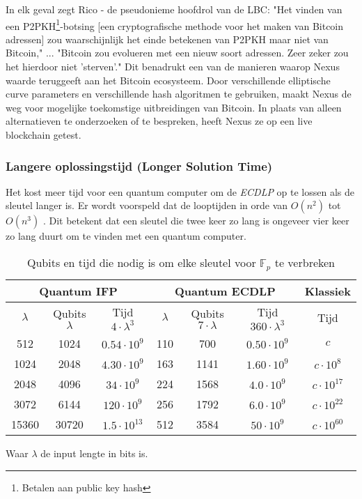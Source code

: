\documentclass[11pt]{article}
\begin{document}
\noindent In elk geval zegt Rico - de pseudonieme hoofdrol van de LBC: "Het vinden van een P2PKH\footnote{Betalen aan public key hash\cite{p2pkh}}-botsing [een cryptografische methode voor het maken van Bitcoin adressen] zou waarschijnlijk het einde betekenen van P2PKH maar niet van Bitcoin," ... "Bitcoin zou evolueren met een nieuw soort adressen. Zeer zeker zou het hierdoor niet 'sterven'."\cite{largebitcoin}
Dit benadrukt een van de manieren waarop Nexus waarde teruggeeft aan het Bitcoin ecosysteem. Door verschillende elliptische curve parameters en verschillende hash algoritmen te gebruiken, maakt Nexus de weg voor mogelijke toekomstige uitbreidingen van Bitcoin. In plaats van alleen alternatieven te onderzoeken of te bespreken, heeft Nexus ze op een live blockchain getest.

\subsubsection*{Langere oplossingstijd (Longer Solution Time)}

Het kost meer tijd voor een quantum computer om de \textit{ECDLP} op te lossen als de sleutel langer is.
Er wordt voorspeld dat de looptijden in orde van $O(n^2)$ tot $O(n^3)$ \cite{prooszalka,kayezalka}.
Dit betekent dat een sleutel die twee keer zo lang is ongeveer vier keer zo lang duurt om te vinden met een quantum computer.

\begin{table}[ht]
\caption{Qubits en tijd die nodig is om elke sleutel voor $\mathbb{F}_{p}$ te verbreken \cite{quantumattacks}}
\begin{center}
\begin{tabular}{|c|c|c||c|c|c||c|}
    \hline
    \multicolumn{3}{|c||}{Quantum IFP} &
    \multicolumn{3}{c||}{Quantum ECDLP} &
    Klassiek \\
    \hline
    $\lambda$ & Qubits $\lambda$ & Tijd $4 \cdot \lambda ^ 3$ & $\lambda$ & Qubits $7 \cdot \lambda$ & Tijd $360 \cdot \lambda ^ 3$ & Tijd \\
    \hline
    \hline
    512 & 1024 & $0.54 \cdot 10^9$ & 
    110 & 700  & $0.50 \cdot 10^9$ & $c$ \\
    
    1024 & 2048 & $4.30 \cdot 10^9$ & 
    163  & 1141 & $1.60 \cdot 10^9$ & $c \cdot 10^8$ \\
    
    2048 & 4096 & $34 \cdot 10^9$ & 
    224  & 1568 & $4.0 \cdot 10^9$ & $c \cdot 10^{17}$ \\
    
    3072 & 6144 & $120 \cdot 10^9$ & 
    256 & 1792  & $6.0 \cdot 10^9$ & $c \cdot 10^{22}$ \\
    
    15360 & 30720 & $1.5 \cdot 10^{13}$ & 
    512   & 3584  & $50 \cdot 10^9$ & $c \cdot 10^{60}$ \\
    \hline
\end{tabular}
Waar $\lambda$ de input lengte in bits is.
\end{center}
\end{table}
\end{document}
